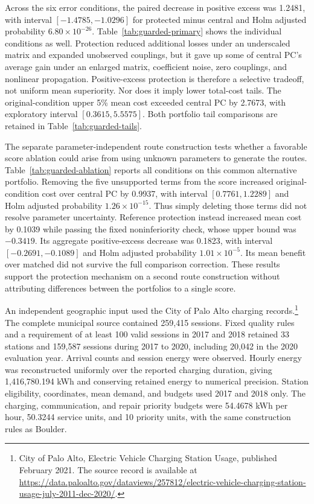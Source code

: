 Across the six error conditions, the paired decrease in positive excess was
1.2481, with interval $[-1.4785,-1.0296]$ for protected minus central and
Holm adjusted probability $6.80\times10^{-26}$.
Table~\ref{tab:guarded-primary} shows the individual conditions as well.
Protection reduced additional losses under an underscaled matrix and
expanded unobserved couplings, but it gave up some of central PC's average
gain under an enlarged matrix, coefficient noise, zero couplings, and
nonlinear propagation.  Positive-excess protection is therefore a selective
tradeoff, not uniform mean superiority.  Nor does it imply lower total-cost
tails.  The original-condition upper 5\% mean cost exceeded central PC by
2.7673, with exploratory interval $[0.3615,5.5575]$.  Both portfolio tail
comparisons are retained in Table~\ref{tab:guarded-tails}.

The separate parameter-independent route construction tests whether a
favorable score ablation could arise from using unknown parameters to
generate the routes.  Table~\ref{tab:guarded-ablation} reports all conditions
on this common alternative portfolio.  Removing the five unsupported terms
from the score increased original-condition cost over central PC by 0.9937,
with interval $[0.7761,1.2289]$ and Holm adjusted probability
$1.26\times10^{-15}$.  Thus simply deleting those terms did not resolve
parameter uncertainty.  Reference protection instead increased mean cost by
0.1039 while passing the fixed noninferiority check, whose upper bound was
$-0.3419$.  Its aggregate positive-excess decrease was 0.1823, with interval
$[-0.2691,-0.1089]$ and Holm adjusted probability $1.01\times10^{-5}$.
Its mean benefit over matched did not survive the full comparison correction.
These results support the protection mechanism on a second route construction
without attributing differences between the portfolios to a single score.

An independent geographic input used the City of Palo Alto charging
records.\footnote{City of Palo Alto, Electric Vehicle Charging Station Usage,
published February 2021. The source record is available at
\url{https://data.paloalto.gov/dataviews/257812/electric-vehicle-charging-station-usage-july-2011-dec-2020/}.}
The complete municipal source contained 259,415 sessions.  Fixed quality
rules and a requirement of at least 100 valid sessions in 2017 and 2018
retained 33 stations and 159,587 sessions during 2017 to 2020, including
20,042 in the 2020 evaluation year.  Arrival counts and session energy were
observed.  Hourly energy was reconstructed uniformly over the reported
charging duration, giving 1,416,780.194 kWh and conserving retained energy
to numerical precision.  Station eligibility, coordinates, mean demand,
and budgets used 2017 and 2018 only.  The charging, communication, and
repair priority budgets were 54.4678 kWh per hour, 50.3244 service units,
and 10 priority units, with the same construction rules as Boulder.

